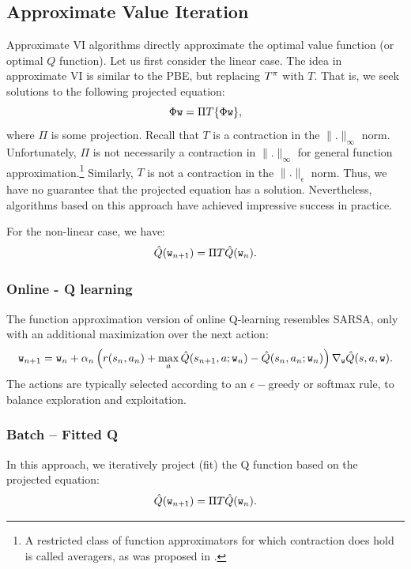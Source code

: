 \subsection{Approximate Value Iteration}
Approximate VI algorithms directly approximate the optimal value function (or optimal $Q$ function). Let us first consider the linear case. The idea in approximate VI is similar to the PBE, but replacing $T^\pi$ with $T$. That is, we seek solutions to the following projected equation:
\begin{equation*}
    \Phi \texttt{w} = \Pi T \{\Phi \texttt{w}\},
\end{equation*}
where $\Pi$ is some projection. Recall that $T$ is a contraction in the $\|.\|_\infty$ norm. Unfortunately, $\Pi$ is not necessarily a contraction in $\|.\|_\infty$ for general function approximation.\footnote{A restricted class of function approximators for which contraction does hold is called averagers, as was proposed in \cite{gordon1995stable}.} Similarly, $T$ is not a contraction in the $\|.\|_\epsilon$ norm. Thus, we have no guarantee that the projected equation has a solution. Nevertheless, algorithms based on this approach have achieved impressive success in practice. 

For the non-linear case, we have:
\begin{equation*}
    \hat{Q}(\texttt{w}_{n+1}) = \Pi T \hat{Q}(\texttt{w}_{n}).
\end{equation*}

\subsubsection{Online - Q learning}
The function approximation version of online Q-learning resembles SARSA, only with an additional maximization over the next action:
\begin{equation*}
    \texttt{w}_{n+1} = \texttt{w}_n + \alpha_n \left( r(s_n,a_n) + \max_a \hat{Q}(s_{n+1},a;\texttt{w}_n) - \hat{Q}(s_{n},a_{n}; \texttt{w}_n) \right) \nabla_{\texttt{w}} \hat{Q}(s,a,\texttt{w}).
\end{equation*}
The actions are typically selected according to an $\epsilon-$greedy or softmax rule, to balance exploration and exploitation.

\subsubsection{Batch -- Fitted Q}

In this approach, we iteratively project (fit) the Q function based on the projected equation:
\begin{equation*}
    \hat{Q}(\texttt{w}_{n+1}) = \Pi T \hat{Q}(\texttt{w}_{n}).
\end{equation*}

